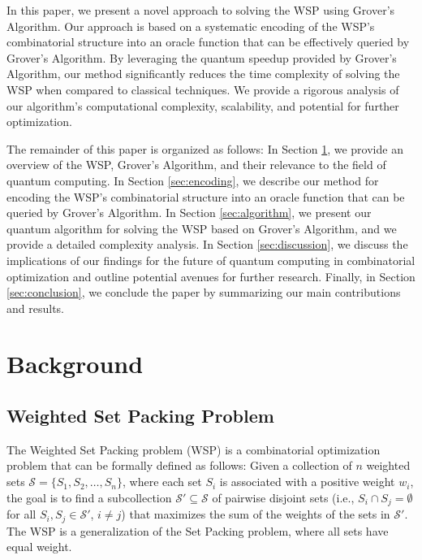 In this paper, we present a novel approach to solving the WSP using Grover's Algorithm. Our approach is based on a systematic encoding of the WSP's combinatorial structure into an oracle function that can be effectively queried by Grover's Algorithm. By leveraging the quantum speedup provided by Grover's Algorithm, our method significantly reduces the time complexity of solving the WSP when compared to classical techniques. We provide a rigorous analysis of our algorithm's computational complexity, scalability, and potential for further optimization.

The remainder of this paper is organized as follows: In Section \ref{sec:background}, we provide an overview of the WSP, Grover's Algorithm, and their relevance to the field of quantum computing. In Section \ref{sec:encoding}, we describe our method for encoding the WSP's combinatorial structure into an oracle function that can be queried by Grover's Algorithm. In Section \ref{sec:algorithm}, we present our quantum algorithm for solving the WSP based on Grover's Algorithm, and we provide a detailed complexity analysis. In Section \ref{sec:discussion}, we discuss the implications of our findings for the future of quantum computing in combinatorial optimization and outline potential avenues for further research. Finally, in Section \ref{sec:conclusion}, we conclude the paper by summarizing our main contributions and results.

\section{Background}\label{sec:background}

\subsection{Weighted Set Packing Problem}

The Weighted Set Packing problem (WSP) is a combinatorial optimization problem that can be formally defined as follows: Given a collection of $n$ weighted sets $\mathcal{S} = \{S_1, S_2, \dots, S_n\}$, where each set $S_i$ is associated with a positive weight $w_i$, the goal is to find a subcollection $\mathcal{S'} \subseteq \mathcal{S}$ of pairwise disjoint sets (i.e., $S_i \cap S_j = \emptyset$ for all $S_i, S_j \in \mathcal{S'}$, $i \neq j$) that maximizes the sum of the weights of the sets in $\mathcal{S'}$. The WSP is a generalization of the Set Packing problem, where all sets have equal weight.

